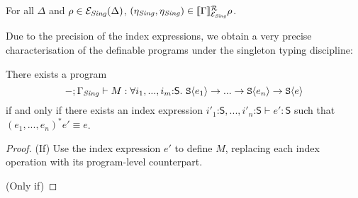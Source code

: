 \begin{lemma}
  For all $\Delta$ and $\rho \in \mathcal{E}_{\mathit{Sing}}(\Delta)$, $(\eta_{\mathit{Sing}}, \eta_{\mathit{Sing}}) \in \llbracket \Gamma \rrbracket^{\mathcal{R}}_{\mathcal{E}_{\mathit{Sing}}}{\rho}$.
\end{lemma}

Due to the precision of the index expressions, we obtain a very
precise characterisation of the definable programs under the singleton
typing discipline:
\begin{theorem}
  There exists a program
  \begin{displaymath}
    -; \Gamma_{\mathit{Sing}} \vdash M : \forall i_1,...,i_m\mathord:\mathsf{S}.\ \textup{\texttt{S}}\langle e_1 \rangle \to ... \to \textup{\texttt{S}}\langle e_n \rangle \to \textup{\texttt{S}}\langle e \rangle
  \end{displaymath}
  if and only if there exists an index expression
  $i'_1\mathord:\mathsf{S}, ..., i'_n\mathord:\mathsf{S} \vdash e' :
  \mathsf{S}$ such that $(e_1,...,e_n)^*e' \equiv e$.
\end{theorem}

\begin{proof}
  (If) Use the index expression $e'$ to define $M$, replacing each
  index operation with its program-level counterpart.

  (Only if) 
\end{proof}



